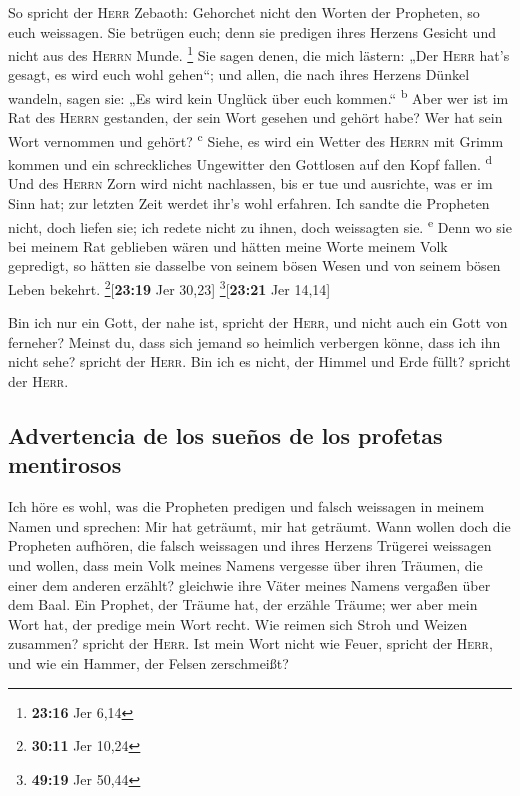  So spricht der \textsc{Herr} Zebaoth: Gehorchet nicht
den Worten der Propheten, so euch weissagen. Sie betrügen euch; denn sie
predigen ihres Herzens Gesicht und nicht aus des \textsc{Herrn} Munde.
\footnote{\textbf{23:16} Jer 6,14}  Sie sagen denen, die
mich lästern: „Der \textsc{Herr} hat's gesagt, es wird euch wohl
gehen``; und allen, die nach ihres Herzens Dünkel wandeln, sagen sie:
„Es wird kein Unglück über euch kommen.`` \textsuperscript{b}
 Aber wer ist im Rat des \textsc{Herrn} gestanden, der
sein Wort gesehen und gehört habe? Wer hat sein Wort vernommen und
gehört? \textsuperscript{c}  Siehe, es wird ein Wetter
des \textsc{Herrn} mit Grimm kommen und ein schreckliches Ungewitter den
Gottlosen auf den Kopf fallen. \textsuperscript{d}  Und
des \textsc{Herrn} Zorn wird nicht nachlassen, bis er tue und ausrichte,
was er im Sinn hat; zur letzten Zeit werdet ihr's wohl erfahren.
 Ich sandte die Propheten nicht, doch liefen sie; ich
redete nicht zu ihnen, doch weissagten sie. \textsuperscript{e}
 Denn wo sie bei meinem Rat geblieben wären und hätten
meine Worte meinem Volk gepredigt, so hätten sie dasselbe von seinem
bösen Wesen und von seinem bösen Leben bekehrt.
\footnote{\textbf{30:11} Jer 10,24}{[}\textbf{23:19} Jer 30,23{]}
\footnote{\textbf{49:19} Jer 50,44}{[}\textbf{23:21} Jer 14,14{]}

 Bin ich nur ein Gott, der nahe ist, spricht der
\textsc{Herr}, und nicht auch ein Gott von ferneher? 
Meinst du, dass sich jemand so heimlich verbergen könne, dass ich ihn
nicht sehe? spricht der \textsc{Herr}. Bin ich es nicht, der Himmel und
Erde füllt? spricht der \textsc{Herr}.

\hypertarget{advertencia-de-los-sueuxf1os-de-los-profetas-mentirosos}{%
\subsection{Advertencia de los sueños de los profetas
mentirosos}\label{advertencia-de-los-sueuxf1os-de-los-profetas-mentirosos}}

 Ich höre es wohl, was die Propheten predigen und falsch
weissagen in meinem Namen und sprechen: Mir hat geträumt, mir hat
geträumt.  Wann wollen doch die Propheten aufhören, die
falsch weissagen und ihres Herzens Trügerei weissagen 
und wollen, dass mein Volk meines Namens vergesse über ihren Träumen,
die einer dem anderen erzählt? gleichwie ihre Väter meines Namens
vergaßen über dem Baal.  Ein Prophet, der Träume hat, der
erzähle Träume; wer aber mein Wort hat, der predige mein Wort recht. Wie
reimen sich Stroh und Weizen zusammen? spricht der \textsc{Herr}.
 Ist mein Wort nicht wie Feuer, spricht der
\textsc{Herr}, und wie ein Hammer, der Felsen zerschmeißt?

